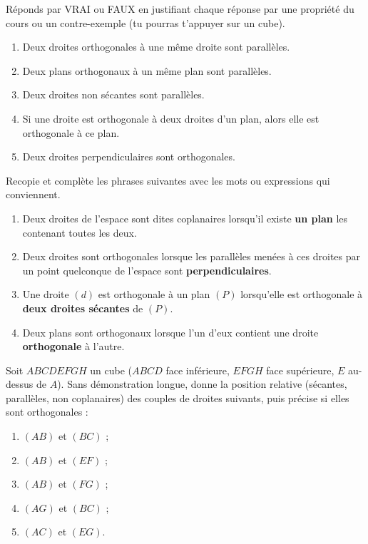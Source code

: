 \documentclass[11pt]{article}
\newcommand{\cle}[1]{{\popxbold\color{popdark}#1}}
\begin{document}
\begin{exercice}
Réponds par VRAI ou FAUX en justifiant chaque réponse par une propriété du cours ou un contre-exemple (tu pourras t'appuyer sur un cube).
\begin{enumerate}
\item Deux droites orthogonales à une même droite sont parallèles.
\item Deux plans orthogonaux à un même plan sont parallèles.
\item Deux droites non sécantes sont parallèles.
\item Si une droite est orthogonale à deux droites d'un plan, alors elle est orthogonale à ce plan.
\item Deux droites perpendiculaires sont orthogonales.
\end{enumerate}
\end{exercice}

\begin{exercice}
Recopie et complète les phrases suivantes avec les mots ou expressions qui conviennent.
\begin{enumerate}
\item Deux droites de l'espace sont dites \cle{coplanaires} lorsqu'il existe \textbf{un plan} les contenant toutes les deux.
\item Deux droites sont \cle{orthogonales} lorsque les parallèles menées à ces droites par un point quelconque de l'espace sont \textbf{perpendiculaires}.
\item Une droite $(d)$ est orthogonale à un plan $(P)$ lorsqu'elle est orthogonale à \textbf{deux droites sécantes} de $(P)$.
\item Deux plans sont \cle{orthogonaux} lorsque l'un d'eux contient une droite \textbf{orthogonale} à l'autre.
\end{enumerate}
\end{exercice}

\begin{exercice}
Soit $ABCDEFGH$ un cube ($ABCD$ face inférieure, $EFGH$ face supérieure, $E$ au-dessus de $A$). Sans démonstration longue, donne la position relative (sécantes, parallèles, non coplanaires) des couples de droites suivants, puis précise si elles sont orthogonales :
\begin{enumerate}
\item $(AB)$ et $(BC)$ ;
\item $(AB)$ et $(EF)$ ;
\item $(AB)$ et $(FG)$ ;
\item $(AG)$ et $(BC)$ ;
\item $(AC)$ et $(EG)$.
\end{enumerate}
\end{exercice}
\end{document}
